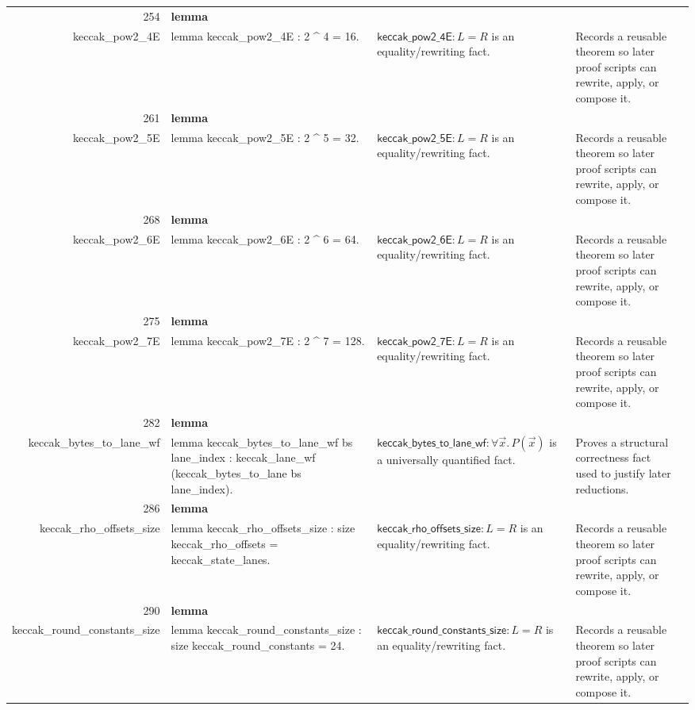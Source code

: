 \documentclass[10pt]{article}
\newcommand{\ec}[1]{\begingroup\ttfamily\scriptsize #1\endgroup}
\begin{document}
\begin{longtable}{r L{0.17\textwidth} L{0.26\textwidth} L{0.27\textwidth} L{0.20\textwidth}}
254 & \textbf{lemma}\\\ec{keccak\_pow2\_4E} & \ec{lemma keccak\_pow2\_4E : 2 \textasciicircum{} 4 = 16.} & \(\mathsf{keccak\_pow2\_4E} : L = R\) is an equality/rewriting fact. & Records a reusable theorem so later proof scripts can rewrite, apply, or compose it. \\
261 & \textbf{lemma}\\\ec{keccak\_pow2\_5E} & \ec{lemma keccak\_pow2\_5E : 2 \textasciicircum{} 5 = 32.} & \(\mathsf{keccak\_pow2\_5E} : L = R\) is an equality/rewriting fact. & Records a reusable theorem so later proof scripts can rewrite, apply, or compose it. \\
268 & \textbf{lemma}\\\ec{keccak\_pow2\_6E} & \ec{lemma keccak\_pow2\_6E : 2 \textasciicircum{} 6 = 64.} & \(\mathsf{keccak\_pow2\_6E} : L = R\) is an equality/rewriting fact. & Records a reusable theorem so later proof scripts can rewrite, apply, or compose it. \\
275 & \textbf{lemma}\\\ec{keccak\_pow2\_7E} & \ec{lemma keccak\_pow2\_7E : 2 \textasciicircum{} 7 = 128.} & \(\mathsf{keccak\_pow2\_7E} : L = R\) is an equality/rewriting fact. & Records a reusable theorem so later proof scripts can rewrite, apply, or compose it. \\
282 & \textbf{lemma}\\\ec{keccak\_bytes\_to\_lane\_wf} & \ec{lemma keccak\_bytes\_to\_lane\_wf bs lane\_index : keccak\_lane\_wf (keccak\_bytes\_to\_lane bs lane\_index).} & \(\mathsf{keccak\_bytes\_to\_lane\_wf} : \forall \vec{x}.\, P(\vec{x})\) is a universally quantified fact. & Proves a structural correctness fact used to justify later reductions. \\
286 & \textbf{lemma}\\\ec{keccak\_rho\_offsets\_size} & \ec{lemma keccak\_rho\_offsets\_size : size keccak\_rho\_offsets = keccak\_state\_lanes.} & \(\mathsf{keccak\_rho\_offsets\_size} : L = R\) is an equality/rewriting fact. & Records a reusable theorem so later proof scripts can rewrite, apply, or compose it. \\
290 & \textbf{lemma}\\\ec{keccak\_round\_constants\_size} & \ec{lemma keccak\_round\_constants\_size : size keccak\_round\_constants = 24.} & \(\mathsf{keccak\_round\_constants\_size} : L = R\) is an equality/rewriting fact. & Records a reusable theorem so later proof scripts can rewrite, apply, or compose it. \\

\end{longtable}
\end{document}
